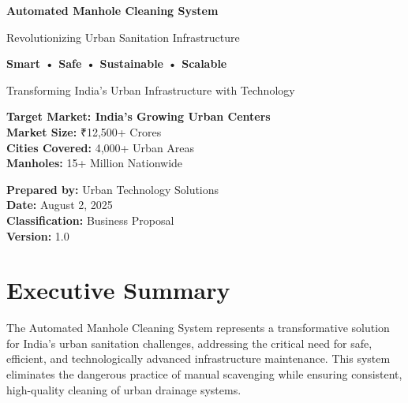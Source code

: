 \documentclass[11pt,a4paper]{article}
\begin{document}
\begin{titlepage}
    \centering
    \vspace*{2cm}
    
    {\Huge\bfseries\color{primary} Automated Manhole Cleaning System}
    
    \vspace{1cm}
    {\Large\color{secondary} Revolutionizing Urban Sanitation Infrastructure}
    
    \vspace{2cm}
    
    \begin{tcolorbox}[colback=success!15, colframe=success, width=0.85\textwidth, arc=5mm]
        \centering
        \large\textbf{Smart • Safe • Sustainable • Scalable}
        
        \vspace{0.5cm}
        Transforming India's Urban Infrastructure with Technology
    \end{tcolorbox}
    
    \vspace{1.5cm}
    
    \begin{market}
        \centering
        \textbf{Target Market: India's Growing Urban Centers}\\
        \vspace{0.3cm}
        \textbf{Market Size:} ₹12,500+ Crores\\
        \textbf{Cities Covered:} 4,000+ Urban Areas\\
        \textbf{Manholes:} 15+ Million Nationwide
    \end{market}
    
    \vfill
    
    {\large
    \textbf{Prepared by:} Urban Technology Solutions\\
    \textbf{Date:} August 2, 2025\\
    \textbf{Classification:} Business Proposal\\
    \textbf{Version:} 1.0
    }
    
\end{titlepage}

\tableofcontents
\newpage

\section{Executive Summary}

\begin{highlight}
The Automated Manhole Cleaning System represents a transformative solution for India's urban sanitation challenges, addressing the critical need for safe, efficient, and technologically advanced infrastructure maintenance. This system eliminates the dangerous practice of manual scavenging while ensuring consistent, high-quality cleaning of urban drainage systems.
\end{highlight}
\end{document}
